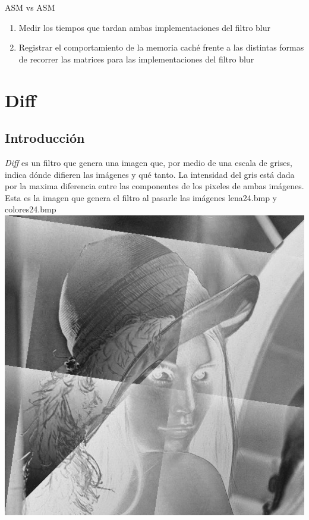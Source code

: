 \documentclass[10pt,a4paper,spanish]{article}
\begin{document}
ASM vs ASM

\begin{enumerate}
	\item Medir los tiempos que tardan ambas implementaciones del filtro blur
	\item Registrar el comportamiento de la memoria caché frente a las distintas formas de recorrer las matrices para las implementaciones del filtro blur
\end{enumerate}

\section{Diff}

\subsection{Introducción}

\textit{Diff} es un filtro que genera una imagen que, por medio de una escala de grises, indica dónde difieren las imágenes y qué tanto.
La intensidad del gris está dada por la maxima diferencia entre las componentes de los pixeles de ambas imágenes. \\

Esta es la imagen que genera el filtro al pasarle las imágenes lena24.bmp y colores24.bmp \\

\includegraphics[keepaspectratio]{diff_lena24_colores24.png}
\end{document}
